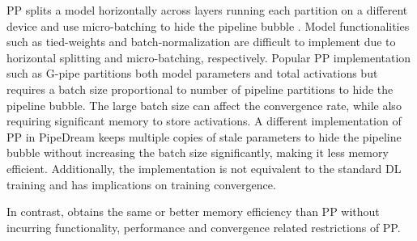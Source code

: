PP splits a model horizontally across layers running each partition on a different device and use micro-batching to hide the pipeline bubble \cite{GPipe,DBLP:journals/corr/pipedream}. Model functionalities such as tied-weights and batch-normalization are difficult to implement due to horizontal splitting and micro-batching, respectively. Popular PP implementation such as G-pipe \cite{GPipe} partitions both model parameters and total activations but requires a batch size proportional to number of pipeline partitions to hide the pipeline bubble. The large batch size can affect the convergence rate, while also requiring significant memory to store activations. A different implementation of PP in PipeDream \cite{narayanan2019pipedream} keeps multiple copies of stale parameters to hide the pipeline bubble without increasing the batch size significantly, making it less memory efficient. Additionally, the implementation is not equivalent to the standard DL training and has implications on training convergence. 
\begin{comment}
Similar to MP, PP is not easily accessible to model scientists: It either requires them to re-write their model using a PP framework, or it requires complex static and run-time analysis support to split a model graph into load balanced pipeline stages.  This requires altering the core of deep learning framework itself (e.g., PyTorch, TensorFlow) \cite{DBLP:journals/corr/pipedream}.  {\color{red} [Not sure if the later is a problem for model scientist]} Furthermore, PP requires a significant increase in batch size to hide the pipeline bubble overhead compared to DP.  Large batch size can lead to slower convergence as discussed in many studies \cite{}.  Alternately, PP requires keeping multiple model states \cite{DBLP:journals/corr/pipedream} to avoid the increase in batch size which not only increases memory but also has convergence implications.  Furthermore, activation memory consumption in PP is inherently imbalanced, as the pipeline stages between forward and backward propagation vary depending on the pipeline stage in between, i.e., initial stages require more memory than the latter stages since the lifetime of activations in the initial stage are longer. 
\end{comment}
In contrast, \name obtains the same or better memory efficiency than PP without incurring functionality, performance and convergence related restrictions of PP.

\begin{comment}
\name addresses the limitations of DP, MP and PP.  \name can scale across multiple nodes without impact on efficiency, while MP can only scale efficiently within a node. \name does not have any load balancing issues or bubble overhead found in PP. Additionally, \name does not require any changes to the model making it as easy to use as pure DP.
\end{comment}


